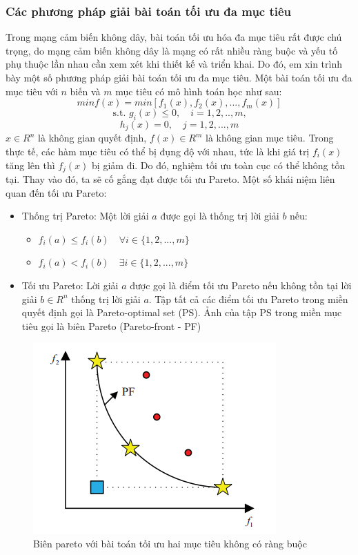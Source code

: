 \documentclass{article}
\begin{document}
\subsubsection{Các phương pháp giải bài toán tối ưu đa mục tiêu}
Trong mạng cảm biến không dây, bài toán tối ưu hóa đa mục tiêu rất được chú trọng, do mạng cảm biến không dây là mạng có rất nhiều ràng buộc và yếu tố phụ thuộc lần nhau cần xem xét khi thiết kế và triển khai. Do đó, em xin trình bày một số phương pháp giải bài toán tối ưu đa mục tiêu.
\newline Một bài toán tối ưu đa mục tiêu với $n$  biến và $m$ mục tiêu có mô hình toán học như sau:
 $$min f(x) = min[f_1(x), f_2(x),..., f_m(x)]$$
 $$\text{s.t. } g_i(x) \leq 0,  \quad i = 1, 2,.., m \text{,}$$
 $$h_j(x) = 0,   \quad j = 1, 2,..., m $$
\newline $x \in R^n$ là không gian quyết định, $f(x) \in R^m$ là không gian mục tiêu. Trong thực tế, các hàm mục tiêu có thể bị đụng độ với nhau, tức là khi giá trị $f_i(x)$ tăng lên thì $f_j(x)$ bị giảm đi. Do đó, nghiệm tối ưu toàn cục có thể không tồn tại. Thay vào đó, ta sẽ cố gắng đạt được tối ưu Pareto. Một số khái niệm liên quan đến tối ưu Pareto:
\begin{itemize}
    \item Thống trị Pareto: Một lời giải $a$ được gọi là thống trị lời giải $b$ nếu:
    \begin{itemize}
        \item $f_i(a) \leq f_i(b) \quad \forall i \in \{1, 2,..., m\}$
        \item $f_i(a) < f_i(b) \quad  \exists  i \in \{1, 2,..., m\}$
    \end{itemize}
    \item Tối ưu Pareto: Lời giải $a$ được gọi là điểm tối ưu Pareto nếu không tồn tại lời giải $b \in R^n$ thống trị lời giải  $a$. Tập tất cả các điểm tối ưu Pareto trong miền quyết định gọi là  Pareto-optimal set (PS). Ảnh của tập PS trong miền mục tiêu gọi là biên Pareto (Pareto-front - PF)
\end{itemize}
\begin{figure}[ht]
\includegraphics[width=\textwidth]{images/pareto.PNG}
\caption{Biên pareto với bài toán tối ưu hai mục tiêu không có ràng buộc \cite{fei2016survey}}
\end{figure}
\end{document}
